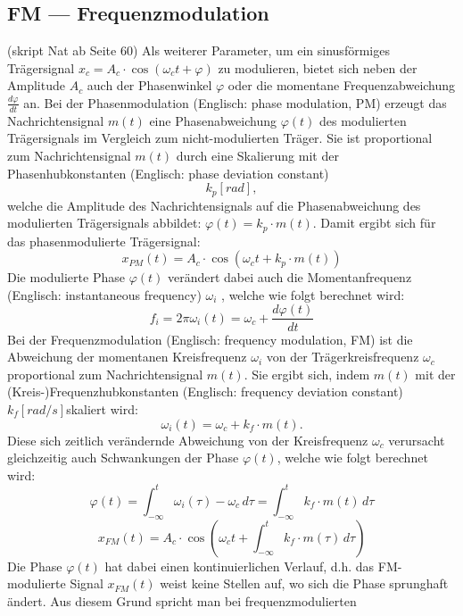 %
%
%
\subsection{FM --- Frequenzmodulation
\label{fm:section:teil1}}
(skript Nat ab Seite 60)
Als weiterer Parameter, um ein sinusförmiges Trägersignal \(x_c = A_c \cdot \cos(\omega_c t + \varphi)\) zu modulieren,
bietet sich neben der Amplitude \(A_c\) auch der Phasenwinkel \(\varphi\) oder die momentane Frequenzabweichung \(\frac{d\varphi}{dt}\) an.
Bei der Phasenmodulation (Englisch: phase modulation, PM) erzeugt das Nachrichtensignal \(m(t)\) eine Phasenabweichung \(\varphi(t)\)
des modulierten Trägersignals im Vergleich zum nicht-modulierten Träger.
Sie ist proportional zum Nachrichtensignal \(m(t)\) durch eine Skalierung mit der Phasenhubkonstanten (Englisch: phase deviation constant) 
\[
    k_p [rad],
\]
welche die Amplitude des Nachrichtensignals auf die Phasenabweichung des
modulierten Trägersignals abbildet: \(\varphi(t) = k_p \cdot m(t)\).
Damit ergibt sich für das phasenmodulierte Trägersignal:
\[
    x_{PM} (t) = A_c \cdot \cos (\omega_c t + k_p \cdot m(t))
\]
Die modulierte Phase \(\varphi(t)\) verändert dabei auch die Momentanfrequenz (Englisch: instantaneous frequency) \(\omega_i\)
, welche wie folgt berechnet wird:
\[
    f_i = 2\pi \omega_i (t) = \omega_c + \frac{d\varphi(t)}{dt}
\]
Bei der Frequenzmodulation (Englisch: frequency modulation, FM) ist die Abweichung der momentanen
Kreisfrequenz \(\omega_i\) von der Trägerkreisfrequenz \(\omega_c\) proportional zum Nachrichtensignal \(m(t)\).
Sie ergibt sich, indem \(m(t)\) mit der (Kreis-)Frequenzhubkonstanten (Englisch: frequency deviation constant) \(k_f [rad/s] \)skaliert wird: 
\[
    \omega_i (t) = \omega_c + k_f \cdot m(t).
\]
Diese sich zeitlich verändernde Abweichung von der Kreisfrequenz \(\omega_c\)
verursacht gleichzeitig auch Schwankungen der Phase \(\varphi(t)\),
welche wie folgt berechnet wird:
\[
    \varphi (t) =
    \int_{-\infty}^t \omega_i (\tau ) - \omega_c\, d\tau =
    \int_{-\infty}^t k_f \cdot m(t)\,d\tau
\]
\[
    x_{FM} (t) = A_c \cdot \cos \left( \omega_c t +  \int_{-\infty}^t k_f  \cdot m ( \tau) \,d\tau \right) 
\]
Die Phase \(\varphi(t)\) hat dabei einen kontinuierlichen Verlauf, d.h. das FM-modulierte Signal \(x_{FM}(t)\) weist keine Stellen auf,
 wo sich die Phase sprunghaft ändert. Aus diesem Grund spricht man bei frequenzmodulierten
